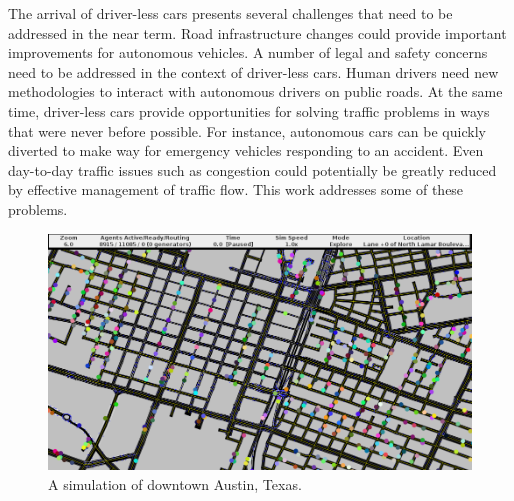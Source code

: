 \documentclass[letterpaper, 10 pt, conference]{ieeeconf}  %
\begin{document}
The arrival of driver-less cars presents several challenges that need to be
addressed in the near term. Road infrastructure changes could provide important
improvements for autonomous vehicles. A number of legal and safety concerns need to be
addressed in the context of driver-less cars. Human drivers need new
methodologies to interact with autonomous drivers on public roads. At the same
time, driver-less cars provide opportunities for solving traffic problems in
ways that were never before possible. For instance, autonomous cars can be
quickly diverted to make way for emergency vehicles responding to an accident.
Even day-to-day traffic issues such as congestion could potentially be greatly
reduced by effective management of traffic flow. This work addresses
some of these problems.





\begin{figure}[h]
  \centering \includegraphics[width=\linewidth]{downtown_atx.png}
  \caption{A simulation of downtown Austin, Texas.}
  \label{fig:ui_screenshot}
  \vspace{-10pt}
\end{figure}
\end{document}

